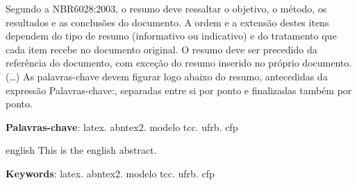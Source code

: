 
\setlength{\absparsep}{18pt} %
\begin{resumo}
 Segundo a NBR6028:2003, o resumo deve ressaltar o objetivo, o método, os 
 resultados e as conclusões do documento. 
 A ordem e a extensão destes itens dependem do tipo de resumo (informativo ou 
 indicativo) e do tratamento que cada item recebe no documento original. 
 O resumo deve ser precedido da referência do documento, com exceção do resumo 
 inserido no próprio documento. 
 (\ldots) As palavras-chave devem figurar logo abaixo do resumo, antecedidas da 
 expressão Palavras-chave:, separadas entre si por ponto e finalizadas também 
 por ponto.

 \textbf{Palavras-chave}: latex. abntex2. modelo tcc. ufrb. cfp
\end{resumo}

\begin{resumo}[Abstract]
 \begin{otherlanguage*}{english}
   This is the english abstract.

   \vspace{\onelineskip}
 
   \noindent 
   \textbf{Keywords}: latex. abntex2. modelo tcc. ufrb. cfp
 \end{otherlanguage*}
\end{resumo}


\tableofcontents*
\cleardoublepage

